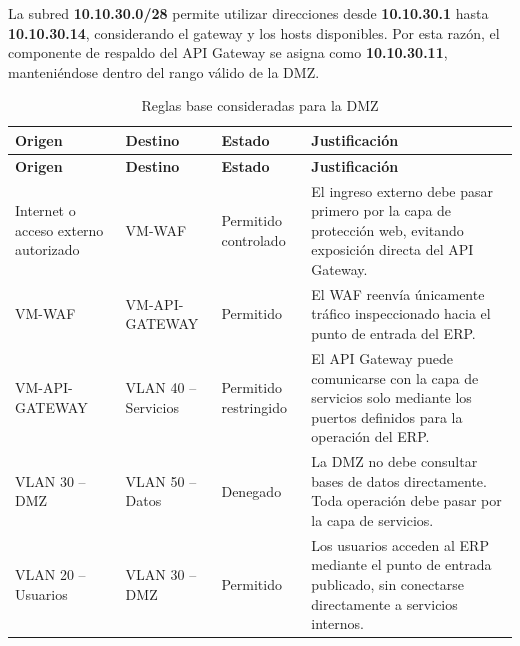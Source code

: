 \documentclass[11pt, a4paper, oneside]{report}
\begin{document}
\normalsize

La subred \textbf{10.10.30.0/28} permite utilizar direcciones desde \textbf{10.10.30.1} hasta \textbf{10.10.30.14}, considerando el gateway y los hosts disponibles. Por esta razón, el componente de respaldo del API Gateway se asigna como \textbf{10.10.30.11}, manteniéndose dentro del rango válido de la DMZ.

\renewcommand{\arraystretch}{1.3}
\footnotesize
{}

\begin{xltabular}{\textwidth}{@{}|L{3.3cm}|L{3.3cm}|L{2.7cm}|X|@{}}
\caption{Reglas base consideradas para la DMZ}
\label{tab:reglas_base_dmz} \\

\parbox[c][1.1cm][c]{\linewidth}{\centering\color{white}\bfseries\small Origen} &
\parbox[c][1.1cm][c]{\linewidth}{\centering\color{white}\bfseries\small Destino} &
\parbox[c][1.1cm][c]{\linewidth}{\centering\color{white}\bfseries\small Estado} &
\parbox[c][1.1cm][c]{\linewidth}{\centering\color{white}\bfseries\small Justificación} \\ \hline
\endfirsthead

\parbox[c][1.1cm][c]{\linewidth}{\centering\color{white}\bfseries\small Origen} &
\parbox[c][1.1cm][c]{\linewidth}{\centering\color{white}\bfseries\small Destino} &
\parbox[c][1.1cm][c]{\linewidth}{\centering\color{white}\bfseries\small Estado} &
\parbox[c][1.1cm][c]{\linewidth}{\centering\color{white}\bfseries\small Justificación} \\ \hline
\endhead

\hline
\endfoot

{\small Internet o acceso externo autorizado} &
{\small VM-WAF} &
{\small Permitido controlado} &
{\small El ingreso externo debe pasar primero por la capa de protección web, evitando exposición directa del API Gateway.} \\ \hline

{\small VM-WAF} &
{\small VM-API-GATEWAY} &
{\small Permitido} &
{\small El WAF reenvía únicamente tráfico inspeccionado hacia el punto de entrada del ERP.} \\ \hline

{\small VM-API-GATEWAY} &
{\small VLAN 40 -- Servicios} &
{\small Permitido restringido} &
{\small El API Gateway puede comunicarse con la capa de servicios solo mediante los puertos definidos para la operación del ERP.} \\ \hline

{\small VLAN 30 -- DMZ} &
{\small VLAN 50 -- Datos} &
{\small Denegado} &
{\small La DMZ no debe consultar bases de datos directamente. Toda operación debe pasar por la capa de servicios.} \\ \hline

{\small VLAN 20 -- Usuarios} &
{\small VLAN 30 -- DMZ} &
{\small Permitido} &
{\small Los usuarios acceden al ERP mediante el punto de entrada publicado, sin conectarse directamente a servicios internos.} \\ \hline

\end{xltabular}
\end{document}
